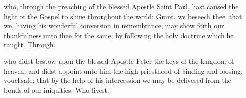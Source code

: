 \vspace{-0.25\baselineskip}

\collect

\vspace{-0.1\baselineskip}

 who, through the preaching of the blessed Apostle Saint Paul, hast caused the light of the Gospel to shine throughout the world; Grant, we beseech thee, that we, having his wonderful conversion in remembrance, may show forth our thankfulness unto thee for the same, by following the holy doctrine which he taught. Through.

 who didst bestow upon thy blessed Apostle Peter the keys of the kingdom of heaven, and didst appoint unto him the high priesthood of binding and loosing: vouchsafe; that by the help of his intercession we may be delivered from the bonds of our iniquities. Who livest.

